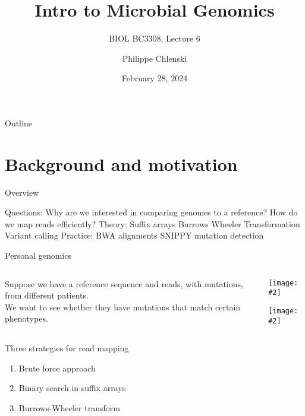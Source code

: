 \documentclass{beamer}
\title{Intro to Microbial Genomics}
\subtitle{BIOL BC3308, Lecture 6}
\author{Philippe Chlenski}
\date{February 28, 2024}
\renewcommand{\c}[1]{\begin{center}#1\end{center}}
\newcommand{\gr}[2][.95]{\c{\texttt{[image: \#2]}}}
\begin{document}
\begin{frame}[plain]
\titlepage
\end{frame}

\begin{frame}{Outline}
\tableofcontents
\end{frame}

\section{Background and motivation}

\begin{frame}{Overview}
    \begin{outline}
        \1[] Questions:
            \2 Why are we interested in comparing genomes to a reference?
            \2 How do we map reads efficiently?
        \1[] Theory:
            \2 Suffix arrays
            \2 Burrows Wheeler Transformation
            \2 Variant calling
        \1[] Practice:
            \2 BWA alignments
            \2 SNIPPY mutation detection
    \end{outline}
\end{frame}

\begin{frame}{Personal genomics}
    \begin{columns}
        \begin{column}{0.5\textwidth}
            Suppose we have a reference sequence and reads, with mutations, from different patients.\\
            \bigskip We want to see whether they have mutations that match certain phenotypes.
        \end{column}
        \begin{column}{0.5\textwidth}
            \gr{l6_figs/s3_snps.png}
            \gr[0.6]{l6_figs/s3_phenotypes.png}
        \end{column}
    \end{columns}
\end{frame}

\begin{frame}{Three strategies for read mapping}
    \begin{enumerate}
        \item Brute force approach
        \item Binary search in suffix arrays
        \item Burrows-Wheeler transform
    \end{enumerate}
\end{frame}
\end{document}
